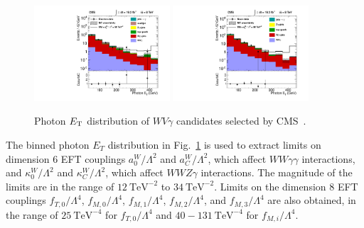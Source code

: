 \begin{figure}[p]
    \centering
    \includegraphics[width=0.45\textwidth]{figures/ss-inclboson-triboson-wvg-ele-cms8tev.pdf}
    \includegraphics[width=0.45\textwidth]{figures/ss-inclboson-triboson-wvg-mu-cms8tev.pdf}
    \caption{Photon $E_{\mathrm{T}}$ distribution of $WV\gamma$ candidates selected by CMS~\cite{Chatrchyan:2014bza}.}
    \label{fig:ss-inclboson-triboson-wvg-cms8tev}
\end{figure}

The binned photon $E_T$ distribution in
Fig.~\ref{fig:ss-inclboson-triboson-wvg-cms8tev} is used to extract
limits on dimension 6 EFT couplings $a^W_0/\Lambda^2$ and
$a^W_C/\Lambda^2$, which affect $WW\gamma\gamma$ interactions, and
$\kappa^W_0/\Lambda^2$ and $\kappa^W_C/\Lambda^2$, which affect
$WWZ\gamma$ interactions.  The magnitude of the limits are in the
range of $12\ \textrm{TeV}^{-2}$ to $34\ \textrm{TeV}^{-2}$.  Limits
on the dimension 8 EFT couplings $f_{T,0}/\Lambda^4$,
$f_{M,0}/\Lambda^4$, $f_{M,1}/\Lambda^4$, $f_{M,2}/\Lambda^4$, and
$f_{M,3}/\Lambda^4$ are also obtained, in the range of
$25\ \textrm{TeV}^{-4}$ for $f_{T,0}/\Lambda^4$ and
$40-131\ \textrm{TeV}^{-4}$ for $f_{M,i}/\Lambda^4$.  
